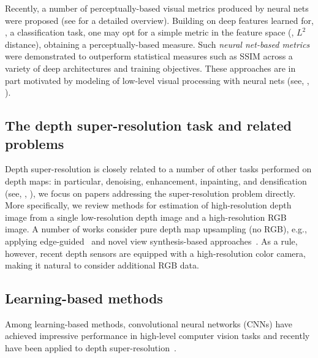 Recently, a number of perceptually-based visual metrics produced by
neural nets were proposed (see \cite{Zhang_2018_CVPR} for a detailed overview). 
Building on deep features learned for, \eg, a classification task, one 
may opt for a simple metric in the feature space (\eg, $L^2$ distance),
obtaining a perceptually-based measure. Such \emph{neural net-based metrics}
were demonstrated to outperform statistical measures such as SSIM
across a variety of deep architectures and training objectives.
These approaches are in part motivated by modeling of low-level visual processing with neural nets (see, \eg, \cite{yamins2016using}).

\subsection{The depth super-resolution task and related problems}


Depth super-resolution is closely related to a number of other tasks performed on depth maps:  
in particular, denoising, enhancement, inpainting, and densification (see, \eg, \cite{chen2018estimating, cheng2018depth, mal2018sparse, hua2018normalized,chodosh2018deep, ma2018self, uhrig2017sparsity, yan2018ddrnet}), 
we focus on papers addressing the super-resolution problem directly. More specifically, we 
review methods for  estimation of high-resolution depth image 
from a single low-resolution depth image and a high-resolution RGB image.
A number of works consider pure depth map upsampling (no RGB), e.g.,  applying edge-guided~\cite{chen2018single} and novel view synthesis-based approaches~\cite{song2018deeply}. As a rule, however, recent depth sensors are equipped with a high-resolution color camera, making it natural to consider additional RGB data.


\subsection{Learning-based methods}
Among learning-based methods, convolutional neural networks (CNNs) have achieved impressive 
performance in high-level computer vision tasks and recently have been applied to depth super-resolution~\cite{chen2018single, song2018deeply,xiao2018joint, li2016deep,kim2018deformable,agresti2017deep,zhao2017simultaneously,hui2016depth,riegler2016deep,song2016deep}.

